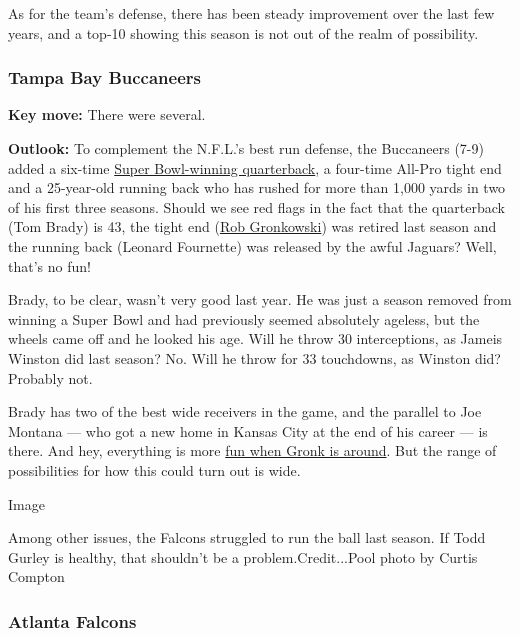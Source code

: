 As for the team's defense, there has been steady improvement over the
last few years, and a top-10 showing this season is not out of the realm
of possibility.

\hypertarget{tampa-bay-buccaneers}{%
\subsubsection{\texorpdfstring{\textbf{Tampa Bay
Buccaneers}}{Tampa Bay Buccaneers}}\label{tampa-bay-buccaneers}}

\textbf{Key move:} There were several.

\textbf{Outlook:} To complement the N.F.L.'s best run defense, the
Buccaneers (7-9) added a six-time
\href{https://www.nytimes3xbfgragh.onion/2020/03/18/sports/football/tom-brady-tampa-bay-buccaneers.html}{Super
Bowl-winning quarterback}, a four-time All-Pro tight end and a
25-year-old running back who has rushed for more than 1,000 yards in two
of his first three seasons. Should we see red flags in the fact that the
quarterback (Tom Brady) is 43, the tight end
(\href{https://www.nytimes3xbfgragh.onion/2020/04/21/sports/football/rob-gronkowski-tom-brady-buccaneers-patriots.html}{Rob
Gronkowski}) was retired last season and the running back (Leonard
Fournette) was released by the awful Jaguars? Well, that's no fun!

Brady, to be clear, wasn't very good last year. He was just a season
removed from winning a Super Bowl and had previously seemed absolutely
ageless, but the wheels came off and he looked his age. Will he throw 30
interceptions, as Jameis Winston did last season? No. Will he throw for
33 touchdowns, as Winston did? Probably not.

Brady has two of the best wide receivers in the game, and the parallel
to Joe Montana --- who got a new home in Kansas City at the end of his
career --- is there. And hey, everything is more
\href{https://www.nytimes3xbfgragh.onion/2020/04/22/sports/football/rob-gronkowski-tom-brady.html}{fun
when Gronk is around}. But the range of possibilities for how this could
turn out is wide.

Image

Among other issues, the Falcons struggled to run the ball last season.
If Todd Gurley is healthy, that shouldn't be a problem.Credit...Pool
photo by Curtis Compton

\hypertarget{atlanta-falcons}{%
\subsubsection{\texorpdfstring{\textbf{Atlanta
Falcons}}{Atlanta Falcons}}\label{atlanta-falcons}}

